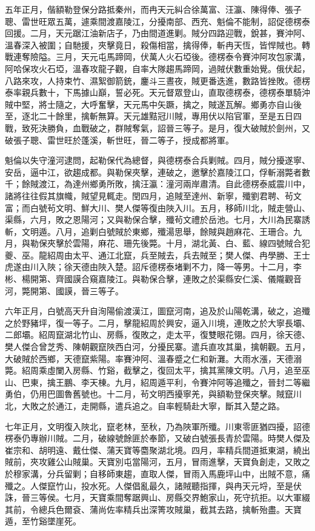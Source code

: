 \begin{pinyinscope}
五年正月，偕額勒登保分路抵秦州，而冉天元糾合徐萬富、汪瀛、陳得俸、張子聰、雷世旺眾五萬，遽乘間渡嘉陵江，分擾南部、西充、魁倫不能制，詔促德楞泰回援。二月，天元踞江油新店子，乃由間道進剿。賊分四路迎戰，銳甚，賽沖阿、溫春深入被圍；自馳援，夾擊竟日，殺傷相當，擒得俸，斬冉天恆，皆悍賊也。轉戰連奪險隘。三月，天元屯馬蹄岡，伏萬人火石埡後。德楞泰令賽沖阿攻包家溝，阿哈保攻火石埡，溫春攻龍子觀，自率大隊趨馬蹄岡，過賊伏數重始覺。俄伏起，八路來攻，人持束竹、濕絮御箭銃，鏖斗三晝夜，賊更番迭進，數路皆挫敗。德楞泰率親兵數十，下馬據山巔，誓必死。天元督眾登山，直取德楞泰，德楞泰單騎沖賊中堅，將士隨之，大呼奮擊，天元馬中矢蹶，擒之，賊遂瓦解。鄉勇亦自山後至，逐北二十餘里，擒斬無算。天元雄黠冠川賊，專用伏以陷官軍，至是五日四戰，致死決勝負，血戰破之，群賊奪氣，詔晉三等子。是月，復大破賊於劍州，又破張子聰、雷世旺於蓬溪，斬世旺，晉二等子，授成都將軍。

魁倫以失守潼河逮問，起勒保代為總督，與德楞泰合兵剿賊。四月，賊分擾遂寧、安岳，逼中江，欲趨成都。與勒保夾擊，連破之，邀擊於嘉陵江口，俘斬溺斃者數千；餘賊渡江，為達州鄉勇所敗，擒汪瀛：潼河兩岸肅清。自此德楞泰威震川中，諸將往往假其旗幟，賊望見輒走。閏四月，追賊至達州、新寧，殲劉君聘、茍文富；而白號茍文明、鮮大川、樊人傑等復由陜入川。五月，移師川北，賊走營山、渠縣，六月，敗之恩陽河；又與勒保合擊，殲茍文禮於岳池。七月，大川為民寨誘斬，文明遁。八月，追剿白號賊於東鄉，殲湯思舉，餘賊與趙麻花、王珊合。九月，與勒保夾擊於雲陽，麻花、珊先後斃。十月，湖北黃、白、藍、線四號賊合犯夔、巫。龍紹周由太平、通江北竄，兵至賊去，兵去賊至；樊人傑、冉學勝、王士虎遂由川入陜；徐天德由陜入楚。詔斥德楞泰堵剿不力，降一等男。十二月，李彬、楊開第、齊國謨合窺嘉陵江。與勒保合擊，連敗之於渠縣安仁溪、儀隴觀音河，斃開第、國謨，晉三等子。

六年正月，白號高天升自洵陽偷渡漢江，圖竄河南，追及於山陽乾溝，破之，追殲之於野豬坪，復一等子。二月，擊龍紹周於興安，逼入川境，連敗之於大寧長壩、二郎壩。紹周竄湖北竹山、房縣，復敗之，走太平，復雙眼花翎。四月，徐天德、樊人傑合曾芝秀、陳朝觀竄陜西白河，分擾民寨。遣兵直攻其巢，擒朝觀。五月，大破賊於西鄉，天德竄紫陽。率賽沖阿、溫春蹙之仁和新灘。大雨水漲，天德溺斃。紹周乘虛闌入房縣、竹谿，截擊之，復回太平，擒其黨陳文明。八月，追至巫山、巴東，擒王鵬、李天棟。九月，紹周遁平利，令賽沖阿等追殲之，晉封二等繼勇伯，仍用巴圖魯舊號也。十二月，茍文明西擾寧羌，與額勒登保夾擊。賊竄川北，大敗之於通江，走開縣，遣兵追之。自率輕騎赴大寧，斷其入楚之路。

七年正月，文明復入陜北，竄老林，至秋，乃為陜軍所殲。川東零匪猶四擾，詔德楞泰仍專辦川賊。二月，破線號餘匪於奉節，又破白號張長青於雲陽。時樊人傑及崔宗和、胡明遠、戴仕傑、蒲天寶等麕聚湖北境。四月，率精兵間道抵東湖，繞出賊前，夾攻雞公山賊巢。天寶別屯當陽河，五月，冒雨進擊，天寶負創走，又敗之於穆家溝，分兵留剿；自移師東趨，直取人傑，冒雨入馬鹿坪山中，出賊不意，痛殲之。人傑竄竹山，投水死。人傑倡亂最久，諸賊聽指揮，與冉天元埒，至是伏誅，晉三等侯。七月，天寶乘間奪踞興山、房縣交界鮑家山，死守抗拒。以大軍綴其前，令總兵色爾袞、蒲尚佐率精兵出深箐攻賊巢，截其去路，擒斬殆盡。天寶遁，至竹谿墜崖死。


\end{pinyinscope}

